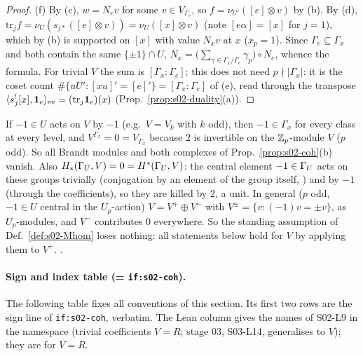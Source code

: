 \begin{proof}
(f) By (c), $w=N_ev$ for some $v\in V_{\Gamma_e}$, so $f=\nu_{U'}([e]\otimes v)$ by (b). By (d), $\mathrm{tr}_jf=\nu_U(s_{j*}([e]\otimes v))=\nu_U([x]\otimes v)$
(note $[e\alpha]=[x]$ for $j=1$), which by (b) is supported on $[x]$ with value $N_xv$ at $x$ ($x_p=1$). Since $\Gamma_e\subseteq\Gamma_x$ and both contain the same
$\{\pm1\}\cap U$, $N_x=\big(\sum_{\gamma\in\Gamma_x/\Gamma_e}\gamma_p\big)\circ N_e$, whence the formula. For trivial $V$ the sum is $[\Gamma_x:\Gamma_e]$; this does not need
$p\nmid|\Gamma_x|$: it is the coset count $\#\{uU':[xu]'=[e]'\}=[\Gamma_x:\Gamma_e]$ of (e), read through the transpose $\langle s_j^![x],\mathbf 1_e\rangle_{\rm ev}=(\mathrm{tr}_j\mathbf 1_e)(x)$
(Prop.~\ref{prop:s02-duality}(a)).
\end{proof}

\begin{remark}\label{rem:s02-minusone}
If $-1\in U$ acts on $V$ by $-1$ (e.g.\ $V=V_k$ with $k$ odd), then $-1\in\Gamma_x$ for every class at every level, and
$V^{\Gamma_x}=0=V_{\Gamma_x}$ because $2$ is invertible on the $\mathbb{Z}_p$-module $V$ ($p$ odd). So all Brandt modules and both complexes of
Prop.~\ref{prop:s02-coh}(b) vanish. Also $H_*(\Gamma_U,V)=0=H^*(\Gamma_U,V)$: the central element $-1\in\Gamma_U$ acts on these groups trivially (conjugation by an element of
the group itself, ) and by $-1$ (through the coefficients), so they are killed by $2$, a unit.
In general ($p$ odd, $-1\in U$ central in the $U_p$-action) $V=V^+\oplus V^-$ with $V^\pm=\{v:(-1)v=\pm v\}$, as $U_p$-modules, and $V^-$ contributes $0$
everywhere. So the standing assumption of Def.~\ref{def:s02-Mhom} loses nothing: all statements below hold for $V$ by applying them to $V^+$. \stproved.
\end{remark}

\paragraph{Sign and index table (= \texttt{if:s02-coh}).}\label{if:s02-coh} The following table fixes all conventions of this section. Its first two rows are
the sign line of \texttt{if:s02-coh}, verbatim. The Lean column gives the names of S02-L9 in the namespace
 (trivial coefficients $V=R$; stage 03, S03-L14, generalises to $V$); they are \stformal{} for $V=R$.

